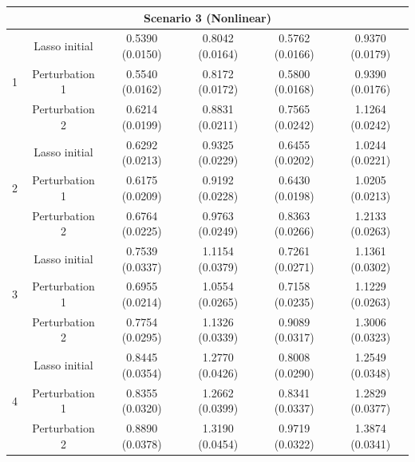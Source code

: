 \documentclass[12pt]{article}
\begin{document}
\begin{table}[!ht]
\begin{tabular}{cccccc}
        \hline 
         \multicolumn{6}{c}{\textbf{Scenario 3 (Nonlinear)}}\\
        \hline
       \multirow{3}{*}{1} 
        & Lasso initial & 0.5390 (0.0150) & 0.8042 (0.0164) & 0.5762 (0.0166) & 0.9370 (0.0179) \\
        & Perturbation 1 & 0.5540 (0.0162)  & 0.8172 (0.0172) & 0.5800 (0.0168)  & 0.9390 (0.0176)  \\ 
        & Perturbation 2 & 0.6214 (0.0199) & 0.8831 (0.0211) & 0.7565 (0.0242) & 1.1264 (0.0242) \\
        \hline
        \multirow{3}{*}{2} 
        & Lasso initial & 0.6292 (0.0213) & 0.9325 (0.0229) & 0.6455 (0.0202) & 1.0244 (0.0221) \\
        & Perturbation 1 & 0.6175 (0.0209) &0.9192 (0.0228)  & 0.6430 (0.0198) & 1.0205 (0.0213) \\
        & Perturbation 2 & 0.6764 (0.0225) & 0.9763 (0.0249)  & 0.8363 (0.0266)& 1.2133 (0.0263)\\
        \hline
        \multirow{3}{*}{3} 
        & Lasso initial  & 0.7539 (0.0337) & 1.1154 (0.0379) & 0.7261 (0.0271) & 1.1361 (0.0302) \\
        & Perturbation 1 & 0.6955 (0.0214)& 1.0554 (0.0265) & 0.7158 (0.0235)  & 1.1229 (0.0263)\\
        & Perturbation 2  &  0.7754 (0.0295)  & 1.1326 (0.0339) & 0.9089 (0.0317)  & 1.3006 (0.0323) \\
        \hline
        \multirow{3}{*}{4} 
        & Lasso initial  & 0.8445 (0.0354) & 1.2770 (0.0426) & 0.8008 (0.0290)  & 1.2549 (0.0348) \\
        & Perturbation 1  & 0.8355 (0.0320) & 1.2662 (0.0399)  & 0.8341 (0.0337) & 1.2829 (0.0377)\\
        & Perturbation 2 & 0.8890 (0.0378) & 1.3190 (0.0454) & 0.9719 (0.0322)  & 1.3874 (0.0341)  \\
        \bottomrule
    \end{tabular}
\end{table}
\end{document}
